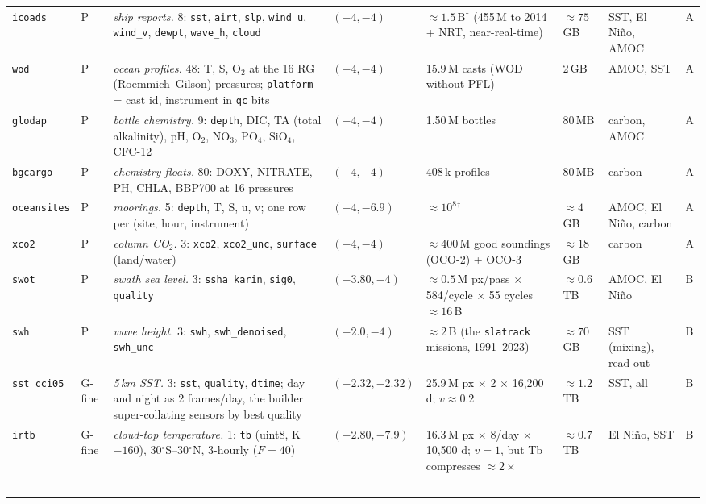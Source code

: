 \documentclass[10pt]{article}
\newcommand{\code}[1]{\texttt{#1}}
\begin{document}
\begin{table}[p]
\begin{tabular}{@{}L{1.55cm}L{0.85cm}L{3.5cm}L{1.9cm}L{2.2cm}L{1.9cm}L{1.7cm}L{0.6cm}@{}}
\code{icoads} & P & \emph{ship reports.} 8: \code{sst}, \code{airt}, \code{slp}, \code{wind\_u}, \code{wind\_v}, \code{dewpt}, \code{wave\_h}, \code{cloud} & $(-4, -4)$ & $\approx 1.5$\,B$^\dagger$ (455\,M to 2014 + NRT, near-real-time) & $\approx 75$\,GB & SST, El Ni\~no, AMOC & A \\
\code{wod} & P & \emph{ocean profiles.} 48: T, S, O$_2$ at the 16 RG (Roemmich--Gilson) pressures; \code{platform} = cast id, instrument in \code{qc} bits & $(-4, -4)$ & 15.9\,M casts (WOD without PFL) & 2\,GB & AMOC, SST & A \\
\code{glodap} & P & \emph{bottle chemistry.} 9: \code{depth}, DIC, TA (total alkalinity), pH, O$_2$, NO$_3$, PO$_4$, SiO$_4$, CFC-12 & $(-4, -4)$ & 1.50\,M bottles & 80\,MB & carbon, AMOC & A \\
\code{bgcargo} & P & \emph{chemistry floats.} 80: DOXY, NITRATE, PH, CHLA, BBP700 at 16 pressures & $(-4, -4)$ & 408\,k profiles & 80\,MB & carbon & A \\
\code{oceansites} & P & \emph{moorings.} 5: \code{depth}, T, S, u, v; one row per (site, hour, instrument) & $(-4, -6.9)$ & $\approx 10^8$$^\dagger$ & $\approx 4$\,GB & AMOC, El Ni\~no, carbon & A \\
\code{xco2} & P & \emph{column CO$_2$.} 3: \code{xco2}, \code{xco2\_unc}, \code{surface} (land/water) & $(-4, -4)$ & $\approx 400$\,M good soundings (OCO-2) + OCO-3 & $\approx 18$\,GB & carbon & A \\
\addlinespace
\code{swot} & P & \emph{swath sea level.} 3: \code{ssha\_karin}, \code{sig0}, \code{quality} & $(-3.80, -4)$ & $\approx 0.5$\,M px/pass $\times$ 584/cycle $\times$ 55 cycles $\approx 16$\,B & $\approx 0.6$\,TB & AMOC, El Ni\~no & B \\
\code{swh} & P & \emph{wave height.} 3: \code{swh}, \code{swh\_denoised}, \code{swh\_unc} & $(-2.0, -4)$ & $\approx 2$\,B (the \code{slatrack} missions, 1991--2023) & $\approx 70$\,GB & SST (mixing), read-out & B \\
\code{sst\_cci05} & G-fine & \emph{5\,km SST.} 3: \code{sst}, \code{quality}, \code{dtime}; day and night as 2 frames/day, the builder super-collating sensors by best quality & $(-2.32, -2.32)$ & 25.9\,M px $\times$ 2 $\times$ 16,200 d; $v \approx 0.2$ & $\approx 1.2$\,TB & SST, all & B \\
\code{irtb} & G-fine & \emph{cloud-top temperature.} 1: \code{tb} (uint8, K$-160$), 30$^\circ$S--30$^\circ$N, 3-hourly ($F = 40$) & $(-2.80, -7.9)$ & 16.3\,M px $\times$ 8/day $\times$ 10,500 d; $v = 1$, but Tb compresses $\approx 2\times$ & $\approx 0.7$\,TB & El Ni\~no, SST & B \\
$$
\end{tabular}
\end{table}
\end{document}
